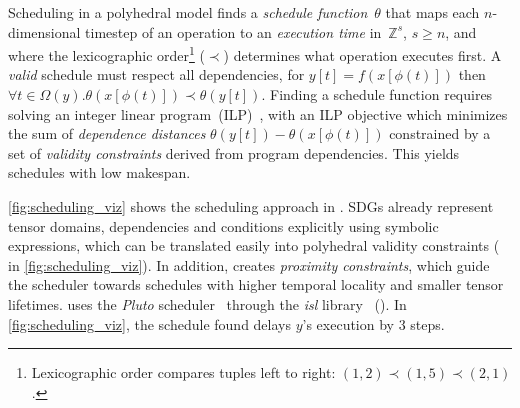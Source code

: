 

Scheduling in a polyhedral model finds a \emph{schedule function}~$\theta$ that maps each $n$-dimensional timestep of an operation to an \emph{execution time} in~$\mathbb{Z}^{s}$, $s \geq n$, and where the lexicographic order\footnote{Lexicographic order compares tuples left to right: $(1,2) \prec (1,5) \prec (2,1)$.} ($\prec$) determines what operation executes first. A \emph{valid} schedule must respect all dependencies, \ie  for $y[t]\!=\!f(x[\phi(t)])$ then $\forall t \in \Omega(y) . \theta(x[\phi(t)]) \prec \theta(y[t])$. 
Finding a schedule function requires solving an integer linear program~(ILP)~\cite{verdoolaege2010isl}, with an ILP objective which minimizes the sum of \emph{dependence distances} $\theta(y[t]) - \theta(x[\phi(t)])$ constrained by a set of \emph{validity constraints} derived from program dependencies. This yields schedules with low makespan.

\F\ref{fig:scheduling_viz} shows the scheduling approach in \sys. SDGs already represent tensor domains, dependencies and conditions explicitly using symbolic expressions, which can be translated easily into polyhedral validity constraints ( in \F\ref{fig:scheduling_viz}). In addition, \sys{} creates \emph{proximity constraints}, which guide the scheduler towards schedules with higher temporal locality and smaller tensor lifetimes. \sys{} uses the \emph{Pluto} scheduler~\cite{bondhugula2008pluto} through the \emph{isl} library~\cite{verdoolaege2010isl} (). 
In \F\ref{fig:scheduling_viz}, the schedule found delays $y$'s execution by 3 steps.


